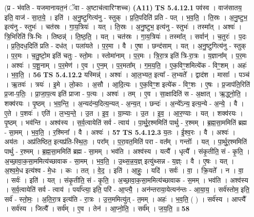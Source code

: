 \documentclass[17pt]{extarticle}
\begin{document}
                  \newline
                      (प्र - भ॑वति - यजमानायत॒नं ॅवा - अ॒ष्टाच॑त्वारिꣳशच्च)  \textbf{(A11)} \newline \newline
                                \textbf{ TS 5.4.12.1} \newline
                  पव॑स्व । वाज॑सातय॒ इति॒ वाज॑ - सा॒त॒ये॒ । इति॑ । अ॒नु॒ष्टुगित्य॑नु - स्तुक् । प्र॒ति॒पदिति॑ प्रति - पत् । भ॒व॒ति॒ । ति॒स्रः । अ॒नु॒ष्टुभ॒ इत्य॑नु - स्तुभः॑ । चत॑स्रः । गा॒य॒त्रियः॑ । यत् । ति॒स्रः । अ॒नु॒ष्टुभ॒ इत्य॑नु - स्तुभः॑ । तस्मा᳚त् । अश्वः॑ । त्रि॒भिरिति॑ त्रि-भिः । तिष्ठन्न्॑ । ति॒ष्ठ॒ति॒ । यत् । चत॑स्रः । गा॒य॒त्रियः॑ । तस्मा᳚त् । सर्वान्॑ । च॒तुरः॑ । प॒दः । प्र॒ति॒दध॒दिति॑ प्रति - दध॑त् । पला॑यते । प॒र॒मा । वै । ए॒षा । छन्द॑साम् । यत् । अ॒नु॒ष्टुगित्य॑नु - स्तुक् । प॒र॒मः । च॒तु॒ष्टो॒म इति॑ चतुः - स्तो॒मः । स्तोमा॑नाम् । प॒र॒मः । त्रि॒रा॒त्र इति॑ त्रि-रा॒त्रः । य॒ज्ञाना᳚म् । प॒र॒मः । अश्वः॑ । प॒शू॒नाम् । प॒र॒मेण॑ । ए॒व । ए॒न॒म् । प॒र॒मता᳚म् । ग॒म॒य॒ति॒ । ए॒क॒विꣳ॒॒शमित्ये॑क - विꣳ॒॒शम् । अहः॑ । भ॒व॒ति॒ । \textbf{  56} \newline
                  \newline
                                \textbf{ TS 5.4.12.2} \newline
                  यस्मिन्न्॑ । अश्वः॑ । आ॒ल॒भ्यत॒ इत्या᳚ - ल॒भ्यते᳚ । द्वाद॑श । मासाः᳚ । पञ्च॑ । ऋ॒तवः॑ । त्रयः॑ । इ॒मे । लो॒काः । अ॒सौ । आ॒दि॒त्यः । ए॒क॒विꣳ॒॒श इत्ये॑क - विꣳ॒॒शः । ए॒षः । प्र॒जाप॑ति॒रिति॑ प्र॒जा-प॒तिः॒ । प्रा॒जा॒प॒त्य इति॑ प्राजा - प॒त्यः । अश्वः॑ । तम् । ए॒व । सा॒क्षादिति॑ स - अ॒क्षात् । ऋ॒द्ध्नो॒ति॒ । शक्व॑रयः । पृ॒ष्ठम् । भ॒व॒न्ति॒ । अ॒न्यद॑न्य॒दित्य॒न्यत् - अ॒न्य॒त् । छन्दः॑ । अ॒न्ये᳚ऽन्य॒ इत्य॒न्ये - अ॒न्ये॒ । वै । ए॒ते । प॒शवः॑ । एति॑ । ल॒भ्य॒न्ते॒ । उ॒त । इ॒व॒ । ग्रा॒म्याः । उ॒त । इ॒व॒ । आ॒र॒ण्याः । यत् । शक्व॑रयः । पृ॒ष्ठम् । भव॑न्ति । अश्व॑स्य । स॒र्व॒त्वायेति॑ सर्व - त्वाय॑ । पा॒र्थु॒र॒श्ममिति॑ पार्थु - र॒श्मम् । ब्र॒ह्म॒सा॒ममिति॑ ब्रह्म - सा॒मम् । भ॒व॒ति॒ । र॒श्मिना᳚ । वै । अश्वः॑ । \textbf{  57} \newline
                  \newline
                                \textbf{ TS 5.4.12.3} \newline
                  य॒तः । ई॒श्व॒रः । वै । अश्वः॑ । अय॑तः । अप्र॑तिष्ठित॒ इत्यप्र॑ति-स्थि॒तः॒ । परा᳚म् । प॒रा॒वत॒मिति॑ परा - वत᳚म् । गन्तोः᳚ । यत् । पा॒र्थु॒र॒श्ममिति॑ पार्थु - र॒श्मम् । ब्र॒ह्म॒सा॒ममिति॑ ब्रह्म - सा॒मम् । भव॑ति । अश्व॑स्य । यत्यै᳚ । धृत्यै᳚ । संकृ॒तीति॒ सं - कृ॒ति॒ । अ॒च्छा॒वा॒क॒सा॒ममित्य॑च्छावाक - सा॒मम् । भ॒व॒ति॒ । उ॒थ्स॒न्न॒य॒ज्ञ् इत्यु॑थ्सन्न - य॒ज्ञ्ः । वै । ए॒षः । यत् । अ॒श्व॒मे॒ध इत्य॑श्व - मे॒धः । कः । तत् । वे॒द॒ । इति॑ । आ॒हुः॒ । यदि॑ । सर्वः॑ । वा॒ । क्रि॒यते᳚ । न । वा॒ । सर्वः॑ । इति॑ । यत् । संकृ॒तीति॒ सं - कृ॒ति॒ । अ॒च्छा॒वा॒क॒सा॒ममित्य॑च्छावाक - स॒मम् । भव॑ति । अश्व॑स्य । स॒र्व॒त्वायेति॑ सर्व - त्वाय॑ । पर्या᳚प्त्या॒ इति॒ परि॑ - आ॒प्त्यै॒ । अन॑न्तराया॒येत्यन॑न्तः - आ॒या॒य॒ । सर्व॑स्तोम॒ इति॒ सर्व॑ - स्तो॒मः॒ । अ॒ति॒रा॒त्र इत्य॑ति - रा॒त्रः । उ॒त्त॒ममित्यु॑त् - त॒मम् । अहः॑ । भ॒व॒ति॒ ( ) । सर्व॑स्य । आप्त्यै᳚ । सर्व॑स्य । जित्यै᳚ । सर्व᳚म् । ए॒व । तेन॑ । आ॒प्नो॒ति॒ । सर्व᳚म् । ज॒य॒ति॒ ॥ \textbf{  58} \newline
\end{document}
